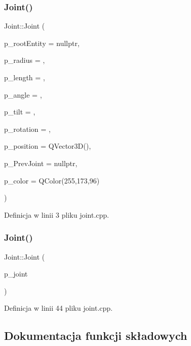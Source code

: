\subsubsection{\texorpdfstring{Joint()}{Joint()}\hspace{0.1cm}{\footnotesize\ttfamily [1/2]}}
{\footnotesize\ttfamily Joint\+::\+Joint (\begin{DoxyParamCaption}\item[{Qt3\+D\+Core\+::\+Q\+Entity $\ast$}]{p\+\_\+root\+Entity = {\ttfamily nullptr},  }\item[{float}]{p\+\_\+radius = {},  }\item[{float}]{p\+\_\+length = {},  }\item[{float}]{p\+\_\+angle = {},  }\item[{float}]{p\+\_\+tilt = {},  }\item[{float}]{p\+\_\+rotation = {},  }\item[{Q\+Vector3D}]{p\+\_\+position = {\ttfamily QVector3D()},  }\item[{\hyperlink{class_joint}{Joint} $\ast$}]{p\+\_\+\+Prev\+Joint = {\ttfamily nullptr},  }\item[{Q\+Color}]{p\+\_\+color = {\ttfamily QColor(255,173,96)} }\end{DoxyParamCaption})}



Definicja w linii 3 pliku joint.\+cpp.

\mbox{\label{class_joint_a9652fa723eed6fe31e1ab4adccbb9c44}} 
\subsubsection{\texorpdfstring{Joint()}{Joint()}\hspace{0.1cm}{\footnotesize\ttfamily [2/2]}}
{\footnotesize\ttfamily Joint\+::\+Joint (\begin{DoxyParamCaption}\item[{const \hyperlink{class_joint}{Joint} \&}]{p\+\_\+joint }\end{DoxyParamCaption})}



Definicja w linii 44 pliku joint.\+cpp.



\subsection{Dokumentacja funkcji składowych}
\mbox{\label{class_joint_a305d99fa57d07d8ed3b478931e4e86e5}} 
